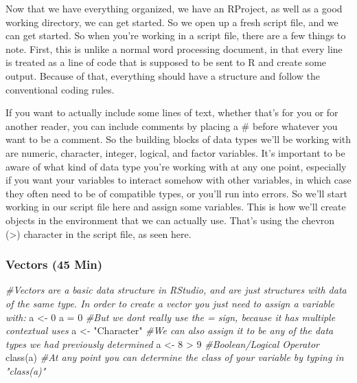 \documentclass[
]{article}
\newenvironment{Shaded}{\begin{snugshade}}{\end{snugshade}}
\newcommand{\CommentTok}[1]{\textcolor[rgb]{0.56,0.35,0.01}{\textit{#1}}}
\newcommand{\DecValTok}[1]{\textcolor[rgb]{0.00,0.00,0.81}{#1}}
\newcommand{\FunctionTok}[1]{\textcolor[rgb]{0.00,0.00,0.00}{#1}}
\newcommand{\NormalTok}[1]{#1}
\newcommand{\OtherTok}[1]{\textcolor[rgb]{0.56,0.35,0.01}{#1}}
\newcommand{\SpecialCharTok}[1]{\textcolor[rgb]{0.00,0.00,0.00}{#1}}
\newcommand{\StringTok}[1]{\textcolor[rgb]{0.31,0.60,0.02}{#1}}
\begin{document}
Now that we have everything organized, we have an RProject, as well as a
good working directory, we can get started. So we open up a fresh script
file, and we can get started. So when you're working in a script file,
there are a few things to note. First, this is unlike a normal word
processing document, in that every line is treated as a line of code
that is supposed to be sent to R and create some output. Because of
that, everything should have a structure and follow the conventional
coding rules.

If you want to actually include some lines of text, whether that's for
you or for another reader, you can include comments by placing a \#
before whatever you want to be a comment. So the building blocks of data
types we'll be working with are numeric, character, integer, logical,
and factor variables. It's important to be aware of what kind of data
type you're working with at any one point, especially if you want your
variables to interact somehow with other variables, in which case they
often need to be of compatible types, or you'll run into errors. So
we'll start working in our script file here and assign some variables.
This is how we'll create objects in the environment that we can actually
use. That's using the chevron (\textgreater) character in the script
file, as seen here.

\hypertarget{vectors-45-min}{%
\subsubsection{Vectors (45 Min)}\label{vectors-45-min}}

\begin{Shaded}
\begin{Highlighting}[]
\CommentTok{\#Vectors are a basic data structure in RStudio, and are just structures with data of the same type. In order to create a vector you just need to assign a variable with:}
\NormalTok{a }\OtherTok{\textless{}{-}} \DecValTok{0}
\NormalTok{a }\OtherTok{=} \DecValTok{0} \CommentTok{\#But we don\textquotesingle{}t really use the = sign, because it has multiple contextual uses}
\NormalTok{a }\OtherTok{\textless{}{-}} \StringTok{"Character"} \CommentTok{\#We can also assign it to be any of the data types we had previously determined}
\NormalTok{a }\OtherTok{\textless{}{-}} \DecValTok{8} \SpecialCharTok{\textgreater{}} \DecValTok{9} \CommentTok{\#Boolean/Logical Operator}
\FunctionTok{class}\NormalTok{(a) }\CommentTok{\#At any point you can determine the class of your variable by typing in "class(a)"}
\end{Highlighting}
\end{Shaded}
\end{document}

